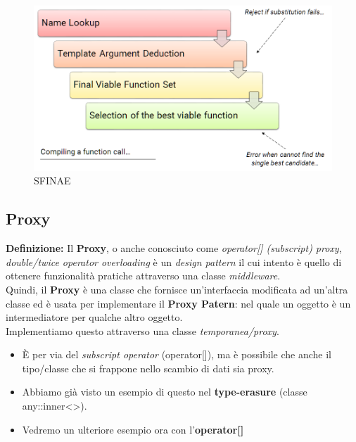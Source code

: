 \begin{figure}[H]
	\centering
	\includegraphics[width=1\textwidth, height=1\textheight, keepaspectratio]{./imgs/SFINAE.png}
	\caption{SFINAE}
	\label{fig:SFINAE}
\end{figure}

\subsection{Proxy}

\textsf{\small \textbf{Definizione: } Il \textbf{Proxy}, o anche conosciuto come \emph{operator[] (subscript) proxy}, \emph{double/twice operator overloading} è un \emph{design pattern} il cui intento è quello di ottenere funzionalità pratiche attraverso una classe \emph{middleware}.} \\

\textsf{\small Quindi, il \textbf{Proxy} è una classe che fornisce un'interfaccia modificata ad un'altra classe ed è usata per implementare il \textbf{Proxy Patern}: nel quale un oggetto è un intermediatore per qualche altro oggetto.} \\

\textsf{\small Implementiamo questo attraverso una classe \emph{temporanea/proxy}.} \break

\begin{itemize}
	\item \textsf{\small È per via del \emph{subscript operator} (operator[]), ma è possibile che anche il tipo/classe che si frappone nello scambio di dati sia proxy. }
	\item \textsf{\small Abbiamo già visto un esempio di questo nel \textbf{type-erasure} (classe any::inner<>).}
	\item \textsf{\small Vedremo un ulteriore esempio ora con l'\textbf{operator[]}}
\end{itemize}

